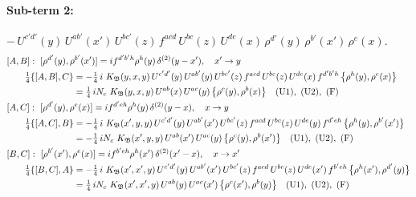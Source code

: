 \documentclass[10pt]{article}
\numberwithin{equation}{section}
\begin{document}
\paragraph{Sub-term 2:} $-\,U^{c'd'}(y)\,U^{ab'}(x')\,U^{bc'}(z)\,f^{acd}\,U^{bc}(z)\,U^{de}(x)\,\rho^{d'}(y)\,\rho^{b'}(x')\,\rho^{e}(x)$.
\begin{align}
&[A,B]:\ [\rho^{d'}(y),\rho^{b'}(x')]=i f^{d'b'h}\rho^{h}(y)\,\delta^{(2)}(y-x'),\quad x'\to y\notag\\
&\qquad \tfrac14\{[A,B],C\}=-\tfrac14\,i\,\,K_{\mathfrak B}(y,x,y)\,U^{c'd'}(y)\,U^{ab'}(y)\,U^{bc'}(z)\,f^{acd}\,U^{bc}(z)\,U^{de}(x)\,f^{d'b'h}\,\big\{\rho^{h}(y),\rho^{e}(x)\big\}\notag\\
&\qquad\phantom{\tfrac14\{[A,B],C\}}=\tfrac14\,i N_{c}\,\,K_{\mathfrak B}(y,x,y)\,U^{ab}(x)\,U^{ac}(y)\,\big\{\rho^{c}(y),\rho^{b}(x)\big\}\quad\text{(U1)},\ \text{(U2)},\ \text{(F)}
\label{eq:GIII.II-2-AB}\\
&[A,C]:\ [\rho^{d'}(y),\rho^{e}(x)]=i f^{d'eh}\rho^{h}(y)\,\delta^{(2)}(y-x),\quad x\to y\notag\\
&\qquad \tfrac14\{[A,C],B\}=-\tfrac14\,i\,\,K_{\mathfrak B}(x',y,y)\,U^{c'd'}(y)\,U^{ab'}(x')\,U^{bc'}(z)\,f^{acd}\,U^{bc}(z)\,U^{de}(y)\,f^{d'eh}\,\big\{\rho^{h}(y),\rho^{b'}(x')\big\}\notag\\
&\qquad\phantom{\tfrac14\{[A,C],B\}}=-\tfrac14\,i N_{c}\,\,K_{\mathfrak B}(x',y,y)\,U^{ab}(x')\,U^{ac}(y)\,\big\{\rho^{c}(y),\rho^{b}(x')\big\}\quad\text{(U1)},\ \text{(U2)},\ \text{(F)}
\label{eq:GIII.II-2-AC}\\
&[B,C]:\ [\rho^{b'}(x'),\rho^{e}(x)]=i f^{b'eh}\rho^{h}(x')\,\delta^{(2)}(x'-x),\quad x\to x'\notag\\
&\qquad \tfrac14\{[B,C],A\}=-\tfrac14\,i\,\,K_{\mathfrak B}(x',x',y)\,U^{c'd'}(y)\,U^{ab'}(x')\,U^{bc'}(z)\,f^{acd}\,U^{bc}(z)\,U^{de}(x')\,f^{b'eh}\,\big\{\rho^{h}(x'),\rho^{d'}(y)\big\}\notag\\
&\qquad\phantom{\tfrac14\{[B,C],A\}}=\tfrac14\,i N_{c}\,\,K_{\mathfrak B}(x',x',y)\,U^{ab}(y)\,U^{ac}(x')\,\big\{\rho^{c}(x'),\rho^{b}(y)\big\}\quad\text{(U1)},\ \text{(U2)},\ \text{(F)}
\label{eq:GIII.II-2-BC}
\end{align}
\end{document}
